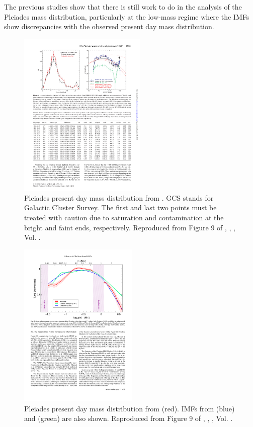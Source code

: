 The previous studies show that there is still work to do in the analysis of the Pleiades mass distribution, particularly at the low-mass regime where the IMFs show discrepancies with the observed present day mass distribution.  

\begin{figure}[ht!]
\begin{center}
\includegraphics[height=8cm]{background/Figures/F9b_Lodieu2012.pdf}
\caption{Pleiades present day mass distribution from \citet{Lodieu2012}. GCS stands for Galactic Cluster Survey. The first and last two points must be treated with caution due to saturation and contamination at the bright and faint ends, respectively. Reproduced from Figure 9 of \citet{Lodieu2012}, \textit{}, , Vol. .}
\label{fig:massLodieu}
\end{center}
\end{figure}

\begin{figure}[ht!]
\begin{center}
\includegraphics[height=8cm]{background/Figures/F9_Bouy2015.pdf}
\caption{Pleiades present day mass distribution  from \citet{Bouy2015} (red). IMFs from \citet{Chabrier2005}(blue) and \citet{Thies2007} (green) are also shown. Reproduced from Figure 9 of \citet{Bouy2015}, \textit{}, , Vol. .}
\label{fig:massBouy}
\end{center}
\end{figure}

